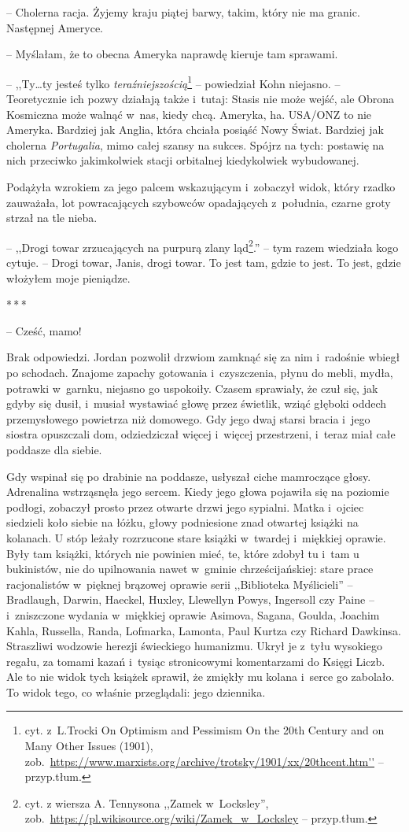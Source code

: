 \documentclass[oneside,polish,11pt,sfheadings]{mwbk}
\newcommand{\threeast}{\bigskip\par\centerline{*\,*\,*}\medskip\par}%
\begin{document}
-- Cholerna racja. Żyjemy kraju piątej barwy, takim, który nie ma granic.
Następnej Ameryce.

-- Myślałam, że to obecna Ameryka naprawdę kieruje tam sprawami.

-- ,,Ty\ldots ty jesteś tylko \emph{teraźniejszością}\footnote{ cyt. z~L.Trocki On
Optimism and Pessimism On the 20th Century and on Many Other Issues
(1901), zob.~\url{https://www.marxists.org/archive/trotsky/1901/xx/20thcent.htm''} -- przyp.tłum.} -- powiedział Kohn niejasno. -- Teoretycznie ich pozwy
działają także i~tutaj: Stasis nie może wejść, ale Obrona Kosmiczna może
walnąć w~nas, kiedy chcą. Ameryka, ha. USA/ONZ to nie Ameryka. Bardziej
jak Anglia, która chciała posiąść Nowy Świat. Bardziej jak cholerna
\emph{Portugalia}, mimo całej szansy na sukces. Spójrz na tych: postawię
na nich przeciwko jakimkolwiek stacji orbitalnej kiedykolwiek
wybudowanej.

Podążyła wzrokiem za jego palcem wskazującym i~zobaczył widok, który
rzadko zauważała, lot powracających szybowców opadających z~południa,
czarne groty strzał na tle nieba.

-- ,,Drogi towar zrzucających na purpurą zlany ląd\footnote{cyt. z wiersza A. Tennysona ,,Zamek w~Locksley'',
zob.~\url{https://pl.wikisource.org/wiki/Zamek\_w\_Locksley} --
przyp.tłum.}.'' -- tym razem wiedziała
kogo cytuje.  -- Drogi towar, Janis, drogi towar. To jest tam, gdzie to
jest. To jest, gdzie włożyłem moje pieniądze.
  \threeast 

-- Cześć, mamo!

Brak odpowiedzi. Jordan pozwolił drzwiom zamknąć się za nim i~radośnie
wbiegł po schodach. Znajome zapachy gotowania i~czyszczenia, płynu do
mebli, mydła, potrawki w~garnku, niejasno go uspokoiły. Czasem
sprawiały, że czuł się, jak gdyby się dusił, i~musiał wystawiać głowę
przez świetlik, wziąć głęboki oddech przemysłowego powietrza niż
domowego. Gdy jego dwaj starsi bracia i~jego siostra opuszczali dom,
odziedziczał więcej i~więcej przestrzeni, i~teraz miał całe poddasze dla
siebie.

Gdy wspinał się po drabinie na poddasze, usłyszał ciche mamroczące
głosy. Adrenalina wstrząsnęła jego sercem. Kiedy jego głowa pojawiła się
na poziomie podłogi, zobaczył prosto przez otwarte drzwi jego sypialni.
Matka i~ojciec siedzieli koło siebie na łóżku, głowy podniesione znad
otwartej książki na kolanach. U stóp leżały rozrzucone stare książki w~twardej i~miękkiej oprawie. Były tam książki, których nie powinien mieć,
te, które zdobył tu i~tam u bukinistów, nie do upilnowania nawet w~gminie chrześcijańskiej: stare prace racjonalistów w~pięknej brązowej
oprawie serii ,,Biblioteka Myślicieli'' -- Bradlaugh, Darwin, Haeckel,
Huxley, Llewellyn Powys, Ingersoll czy Paine -- i~zniszczone wydania w~miękkiej oprawie Asimova, Sagana, Goulda, Joachim Kahla, Russella,
Randa, Lofmarka, Lamonta, Paul Kurtza czy Richard Dawkinsa. Straszliwi
wodzowie herezji świeckiego humanizmu. Ukrył je z~tyłu wysokiego regału,
za tomami kazań i~tysiąc stronicowymi komentarzami do Księgi Liczb. Ale
to nie widok tych książek sprawił, że zmiękły mu kolana i~serce go
zabolało. To widok tego, co właśnie przeglądali: jego dziennika.
\end{document}
